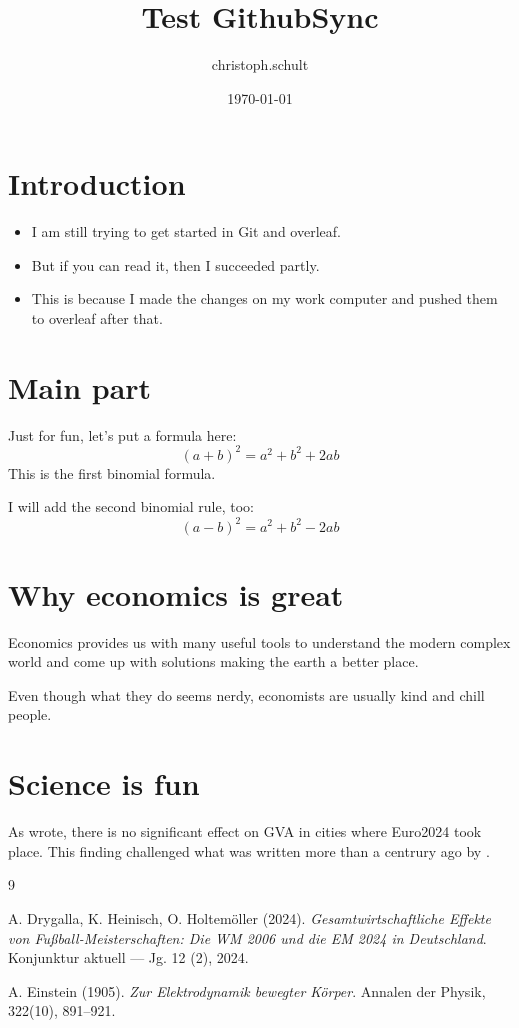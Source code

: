 \documentclass{article}
\title{Test GithubSync}
\author{christoph.schult }
\date{\today}
\begin{document}
\maketitle

\section{Introduction}

\begin{itemize} 
    \item I am still trying to get started in Git and overleaf.
    \item But if you can read it, then I succeeded partly.
    \item This is because I made the changes on my work computer and pushed them to overleaf after that.
\end{itemize}

\section{Main part}
Just for fun, let's put a formula here: 
$$ (a + b)^2 = a^2 + b^2 + 2ab $$
This is the first binomial formula. 

I will add the second binomial rule, too:
$$ (a - b)^2 = a^2 + b^2 - 2ab $$

\section{Why economics is great}
Economics provides us with many useful tools to understand the modern 
complex world and come up with solutions making the earth a better place.

Even though what they do seems nerdy, economists are usually kind and chill people.

\section{Science is fun}
As \cite{holtem2024a} wrote, there is no significant effect on GVA in cities where Euro2024 took place. This finding challenged what was written more than a centrury ago by \cite{einstein1905}.

\begin{thebibliography}{9}

  A. Drygalla, K. Heinisch, O. Holtemöller (2024). 
  \textit{Gesamtwirtschaftliche Effekte von Fußball-Meisterschaften: Die WM 2006 und die EM 2024 in Deutschland}. 
  Konjunktur aktuell — Jg. 12 (2), 2024.


 A. Einstein (1905). 
 \textit{Zur Elektrodynamik bewegter Körper}. 
 Annalen der Physik, 322(10), 891--921.

\end{thebibliography}
\end{document}
